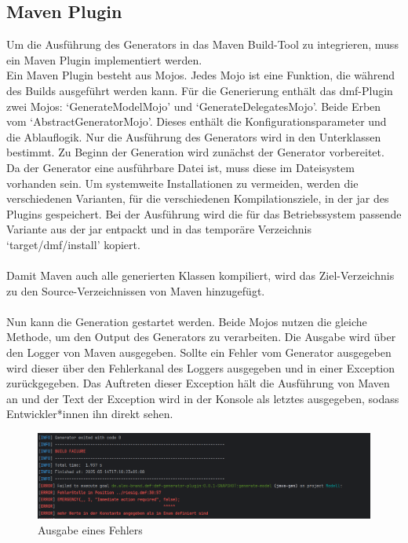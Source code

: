 \documentclass[./einleitung.tex]{subfiles}
\begin{document}
    \subsection{Maven Plugin}
    Um die Ausführung des Generators in das Maven Build-Tool zu integrieren, muss ein Maven Plugin implementiert werden.\\
    Ein Maven Plugin besteht aus Mojos.
    Jedes Mojo ist eine Funktion, die während des Builds ausgeführt werden kann.
    Für die Generierung enthält das \acrshort{dmf}-Plugin zwei Mojos: `GenerateModelMojo' und `GenerateDelegatesMojo'.
    Beide Erben vom `AbstractGeneratorMojo'.
    Dieses enthält die Konfigurationsparameter und die Ablauflogik.
    Nur die Ausführung des Generators wird in den Unterklassen bestimmt.
    \newpage
    Zu Beginn der Generation wird zunächst der Generator vorbereitet.
    Da der Generator eine ausführbare Datei ist, muss diese im Dateisystem vorhanden sein.
    Um systemweite Installationen zu vermeiden, werden die verschiedenen Varianten, für die verschiedenen Kompilationsziele, in der \acrshort{jar} des Plugins gespeichert.
    Bei der Ausführung wird die für das Betriebssystem passende Variante aus der \acrshort{jar} entpackt und in das temporäre Verzeichnis `target/dmf/install' kopiert.
    \\\\
    Damit Maven auch alle generierten Klassen kompiliert, wird das Ziel-Verzeichnis zu den Source-Verzeichnissen von Maven hinzugefügt.
    \\\\
    Nun kann die Generation gestartet werden.
    Beide Mojos nutzen die gleiche Methode, um den Output des Generators zu verarbeiten.
    Die Ausgabe wird über den Logger von Maven ausgegeben.
    Sollte ein Fehler vom Generator ausgegeben wird dieser über den Fehlerkanal des Loggers ausgegeben und in einer Exception zurückgegeben.
    Das Auftreten dieser Exception hält die Ausführung von Maven an und der Text der Exception wird in der Konsole als letztes ausgegeben, sodass Entwickler*innen ihn direkt sehen.
    \begin{figure}[H]
        \centering
        \includegraphics[width=\linewidth]{bilder/screenshot-error-generator}
        \caption{Ausgabe eines Fehlers}
        \label{fig:screenshot-error-generator}
    \end{figure}
\end{document}
